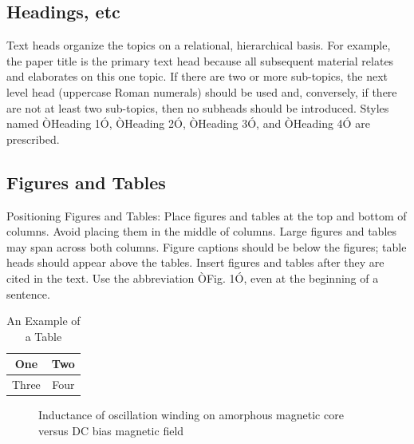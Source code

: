 \documentclass[letterpaper, 10 pt, conference]{ieeeconf}  %
\begin{document}
\subsection{Headings, etc}

Text heads organize the topics on a relational, hierarchical basis. For example, the paper title is the primary text head because all subsequent material relates and elaborates on this one topic. If there are two or more sub-topics, the next level head (uppercase Roman numerals) should be used and, conversely, if there are not at least two sub-topics, then no subheads should be introduced. Styles named ÒHeading 1Ó, ÒHeading 2Ó, ÒHeading 3Ó, and ÒHeading 4Ó are prescribed.

\subsection{Figures and Tables}

Positioning Figures and Tables: Place figures and tables at the top and bottom of columns. Avoid placing them in the middle of columns. Large figures and tables may span across both columns. Figure captions should be below the figures; table heads should appear above the tables. Insert figures and tables after they are cited in the text. Use the abbreviation ÒFig. 1Ó, even at the beginning of a sentence.

\begin{table}[htbp]
\caption{An Example of a Table}
\label{table_example}
\begin{center}
\begin{tabular}{|c||c|}
\hline
One & Two\\
\hline
Three & Four\\
\hline
\end{tabular}
\end{center}
\end{table}


   \begin{figure}[thpb]
      \centering
      \caption{Inductance of oscillation winding on amorphous
       magnetic core versus DC bias magnetic field}
      \label{figurelabel}
   \end{figure}
   
\end{document}
